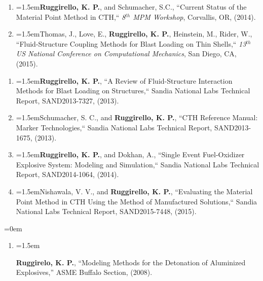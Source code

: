 \documentclass{scrartcl}
\newcommand{\NewCPap}[5]{\noindent\hangindent=1.5em\hangafter=0\footnotesize #1, ``#2,`` \textit{#3}, #4, (#5). %
\vspace{0.em} \normalsize} %
\newcommand{\NewReport}[5]{\noindent\hangindent=1.5em\hangafter=0\footnotesize #1, ``#2,`` #3, #4, (#5). %
\vspace{0.em} \normalsize} %
\newcommand{\NewTalk}[1]{\hangindent=1.5em\hangafter=0\noindent\raggedright\footnotesize{#1}\par\normalsize\vspace{0.em}} %
\begin{document}
\begin{cv}{}
\begin{mdframed}[
  linecolor=white,%
  leftmargin =-0cm,
  rightmargin =+0cm,
]
\begin{enumerate}
\item\NewCPap{\textbf{Ruggirello, K. P.}, and Schumacher, S.C.}{Current Status of the Material Point Method in CTH}{8$^{th}$ MPM Workshop}{Corvallis, OR}{2014}

\item\NewCPap{Thomas, J., Love, E., \textbf{Ruggirello, K. P.}, Heinstein, M., Rider, W.}{Fluid-Structure Coupling Methods for Blast Loading on Thin Shells}{13$^{th}$ US National Conference on Computational Mechanics}{San Diego, CA}{2015}

\end{enumerate}

\vspace{0.5em} %

\vspace{0.5em}

\begin{enumerate}
\itemsep0em
\item\NewReport{\textbf{Ruggirello, K. P.}}{A Review of Fluid-Structure Interaction Methods for Blast Loading on Structures}{Sandia National Labs Technical Report}{SAND2013-7327}{2013}

\item\NewReport{Schumacher, S. C., and \textbf{Ruggirello, K. P.}}{CTH Reference Manual: Marker Technologies}{Sandia National Labs Technical Report}{SAND2013-1675}{2013}

\item\NewReport{\textbf{Ruggirello, K. P.}, and Dokhan, A.}{Single Event Fuel-Oxidizer Explosive System: Modeling and Simulation}{Sandia National Labs Technical Report}{SAND2014-1064}{2014}

\item\NewReport{Nishawala, V. V., and \textbf{Ruggirello, K. P.}}{Evaluating the Material Point Method in CTH Using the Method of Manufactured Solutions}{Sandia National Labs Technical Report}{SAND2015-7448}{2015}
\end{enumerate}

\vspace{0.5em} %

\hangindent=0em\vspace{0.5em}
\begin{enumerate}
\item\NewTalk{\textbf{Ruggirelo, K. P.}, ``Modeling Methods for the Detonation of Aluminized Explosives,'' ASME Buffalo Section, (2008).}


\end{enumerate}
\end{mdframed}
\end{cv}
\end{document}
